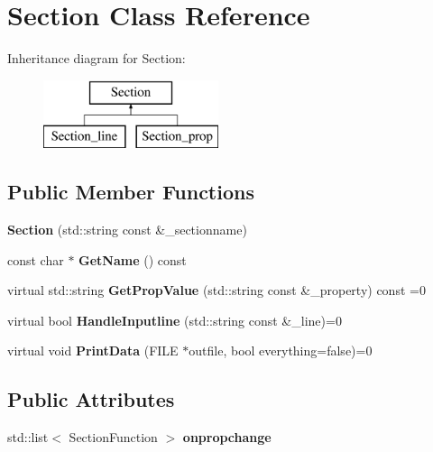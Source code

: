 \hypertarget{classSection}{\section{Section Class Reference}
\label{classSection}
}
Inheritance diagram for Section\-:\begin{figure}[H]
\begin{center}
\leavevmode
\includegraphics[height=2.000000cm]{classSection}
\end{center}
\end{figure}
\subsection*{Public Member Functions}
\begin{DoxyCompactItemize}
\item 
\hypertarget{classSection_a4a98d2cb9e2a235f3513011a0f7f66c5}{{\bfseries Section} (std\-::string const \&\-\_\-sectionname)}\label{classSection_a4a98d2cb9e2a235f3513011a0f7f66c5}

\item 
\hypertarget{classSection_a644c049c74ed2f656b0a2eb65c598b8a}{const char $\ast$ {\bfseries Get\-Name} () const }\label{classSection_a644c049c74ed2f656b0a2eb65c598b8a}

\item 
\hypertarget{classSection_a78709bab9ef9f49a0262ca0db2e2beea}{virtual std\-::string {\bfseries Get\-Prop\-Value} (std\-::string const \&\-\_\-property) const =0}\label{classSection_a78709bab9ef9f49a0262ca0db2e2beea}

\item 
\hypertarget{classSection_a99812ba56e563c00efe7103c3e064801}{virtual bool {\bfseries Handle\-Inputline} (std\-::string const \&\-\_\-line)=0}\label{classSection_a99812ba56e563c00efe7103c3e064801}

\item 
\hypertarget{classSection_a55435e0ee08a27505e9bf81e2abc276e}{virtual void {\bfseries Print\-Data} (F\-I\-L\-E $\ast$outfile, bool everything=false)=0}\label{classSection_a55435e0ee08a27505e9bf81e2abc276e}

\end{DoxyCompactItemize}
\subsection*{Public Attributes}
\begin{DoxyCompactItemize}
\item 
\hypertarget{classSection_a1e89b579d0b265c81bae5bb6a9a814ce}{std\-::list$<$ Section\-Function $>$ {\bfseries onpropchange}}\label{classSection_a1e89b579d0b265c81bae5bb6a9a814ce}

\end{DoxyCompactItemize}



